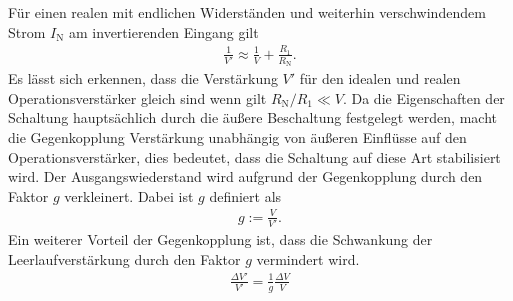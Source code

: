 Für einen realen mit endlichen Widerständen und weiterhin verschwindendem Strom $I_\text{N}$ am invertierenden Eingang gilt 
\begin{align}
	\frac{1}{V'}\approx\frac{1}{V}+\frac{R_1}{R_\text{N}}.
	\label{eq:leerlauf_verstaerkung}
\end{align}
Es lässt sich erkennen, dass die Verstärkung $V'$ für den idealen und realen Operationsverstärker gleich sind wenn gilt $R_\text{N}/R_1\ll V$.
Da die Eigenschaften der Schaltung hauptsächlich durch die äußere Beschaltung festgelegt werden,
macht die Gegenkopplung Verstärkung unabhängig von äußeren Einflüsse auf den Operationsverstärker,
dies bedeutet, dass die Schaltung auf diese Art stabilisiert wird.
Der Ausgangswiederstand wird aufgrund der Gegenkopplung durch den Faktor $g$ verkleinert.
Dabei ist $g$ definiert als
\begin{align}
	g:= \frac{V}{V'}.
\end{align}
Ein weiterer Vorteil der Gegenkopplung ist, dass die Schwankung der Leerlaufverstärkung durch den Faktor $g$ vermindert wird.
\begin{align}
	\frac{\Delta V'}{V'}=\frac{1}{g}\frac{\Delta V}{V}
\end{align}

